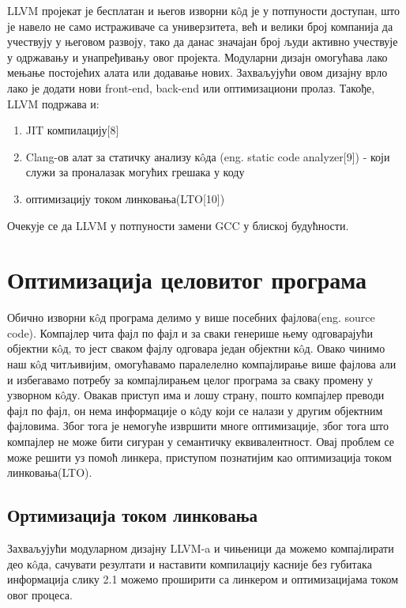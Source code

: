\documentclass[12pt,oneside]{memoir}
\begin{document}
LLVM пројекат је бесплатан и његов изворни к\^{o}д је у потпуности доступан, 
што је навело не само истраживаче са универзитета, већ и велики број компанија 
да учествују у његовом развоју, тако да данас значајан број људи активно 
учествује у одржавању и унапређивању овог пројекта.
Модуларни дизајн омогућава лако мењање постојећих алата или додавање нових.
Захваљујући овом дизајну врло лако је додати нови front-end, back-end или
оптимизациони пролаз.
Такође, LLVM подржава и:
\begin{enumerate}
\item JIT компилацију[8]
\item Clang-ов алат за статичку анализу к\^{o}да (eng. static code analyzer[9]) 
- који служи за  проналазак могућих грешака у коду
\item оптимизацију током линковања(LTO[10])
\end{enumerate}
 Очекује се да LLVM у потпуности замени GCC у блиској будућности.

\chapter{Оптимизација целовитог програма}

Обично изворни к\^{o}д програма делимо у више посебних фајлова(eng. source code).
Компајлер чита фајл по фајл и за сваки генерише њему одговарајући објектни к\^{o}д,
то јест сваком фајлу одговара један објектни к\^{o}д.
Овако чинимо наш к\^{o}д читљивијим, омогућавамо паралелелно компајлирање више 
фајлова али и избегавамо потребу за компајлирањем целог програма за сваку промену
у узворном к\^{o}ду.
Овакав приступ има и лошу страну, пошто компајлер преводи фајл по фајл, он нема 
информације о к\^{o}ду који се налази у другим објектним фајловима.
Због тога је немогуће извршити многе оптимизације, због тога што компајлер не може 
бити сигуран у семантичку еквивалентност.
Овај проблем се може решити уз помоћ линкера, приступом познатијим као 
оптимизација током линковања(LTO).

\section{Ортимизација током линковања}


Захваљујући модуларном дизајну LLVM-a и чињеници да можемо компајлирати део к\^{o}да,
сачувати резултати и наставити компилацију касније без губитака информација
слику 2.1 можемо проширити са линкером и оптимизацијама током овог процеса.
\end{document}
